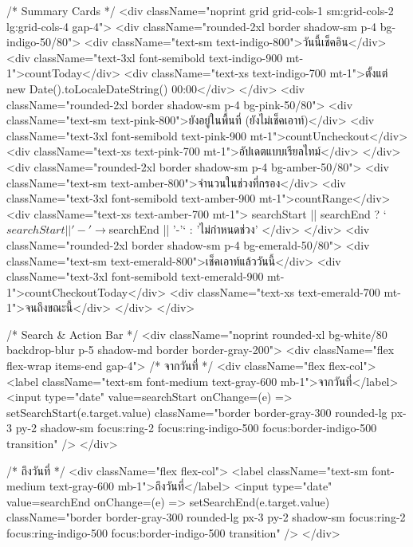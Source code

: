 {      {/* Summary Cards */}
      <div className="noprint grid grid-cols-1 sm:grid-cols-2 lg:grid-cols-4 gap-4">
        <div className="rounded-2xl border shadow-sm p-4 bg-indigo-50/80">
          <div className="text-sm text-indigo-800">วันนี้เช็คอิน</div>
          <div className="text-3xl font-semibold text-indigo-900 mt-1">{countToday}</div>
          <div className="text-xs text-indigo-700 mt-1">ตั้งแต่ {new Date().toLocaleDateString()} 00:00</div>
        </div>
        <div className="rounded-2xl border shadow-sm p-4 bg-pink-50/80">
          <div className="text-sm text-pink-800">ยังอยู่ในพื้นที่ (ยังไม่เช็คเอาท์)</div>
          <div className="text-3xl font-semibold text-pink-900 mt-1">{countUncheckout}</div>
          <div className="text-xs text-pink-700 mt-1">อัปเดตแบบเรียลไทม์</div>
        </div>
        <div className="rounded-2xl border shadow-sm p-4 bg-amber-50/80">
          <div className="text-sm text-amber-800">จำนวนในช่วงที่กรอง</div>
          <div className="text-3xl font-semibold text-amber-900 mt-1">{countRange}</div>
          <div className="text-xs text-amber-700 mt-1">
            {searchStart || searchEnd ? `${searchStart || '-'} → ${searchEnd || '-'}` : 'ไม่กำหนดช่วง'}
          </div>
        </div>
        <div className="rounded-2xl border shadow-sm p-4 bg-emerald-50/80">
          <div className="text-sm text-emerald-800">เช็คเอาท์แล้ววันนี้</div>
          <div className="text-3xl font-semibold text-emerald-900 mt-1">{countCheckoutToday}</div>
          <div className="text-xs text-emerald-700 mt-1">จนถึงขณะนี้</div>
        </div>
      </div>

      {/* Search & Action Bar */}
      <div className="noprint rounded-xl bg-white/80 backdrop-blur p-5 shadow-md border border-gray-200">
        <div className="flex flex-wrap items-end gap-4">
          {/* จากวันที่ */}
          <div className="flex flex-col">
            <label className="text-sm font-medium text-gray-600 mb-1">จากวันที่</label>
            <input
              type="date"
              value={searchStart}
              onChange={(e) => setSearchStart(e.target.value)}
              className="border border-gray-300 rounded-lg px-3 py-2 shadow-sm focus:ring-2 focus:ring-indigo-500 focus:border-indigo-500 transition"
            />
          </div>

          {/* ถึงวันที่ */}
          <div className="flex flex-col">
            <label className="text-sm font-medium text-gray-600 mb-1">ถึงวันที่</label>
            <input
              type="date"
              value={searchEnd}
              onChange={(e) => setSearchEnd(e.target.value)}
              className="border border-gray-300 rounded-lg px-3 py-2 shadow-sm focus:ring-2 focus:ring-indigo-500 focus:border-indigo-500 transition"
            />
          </div>

}
